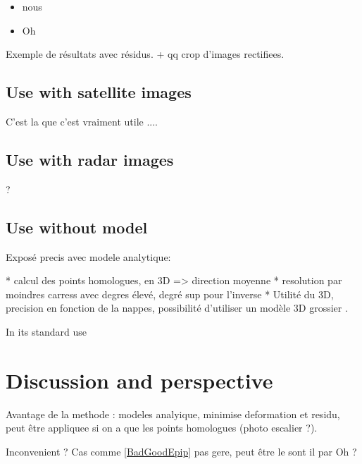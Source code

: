 \documentclass{ipol}
\begin{document}
\begin{itemize}
\item nous
\item Oh
\end{itemize}

Exemple de résultats avec résidus. + qq crop d'images rectifiees.

\subsection{Use with satellite images}

C'est la que c'est vraiment utile .... 


\subsection{Use with radar images}

? 


\subsection{Use without model}


Exposé precis avec modele analytique:

    * calcul des points homologues, en 3D => direction moyenne
    * resolution par moindres carress avec degres élevé, degré sup pour l'inverse
    * Utilité du 3D, precision en fonction de la nappes, possibilité d'utiliser un modèle 3D grossier .

In its standard use
    

\section{Discussion and perspective}

Avantage de la methode : modeles analyique, minimise deformation et residu, peut être appliquee 
si on a que les points homologues (photo escalier ?).

Inconvenient ? Cas comme \ref{BadGoodEpip} pas gere, peut être le sont il par Oh ?
\end{document}
